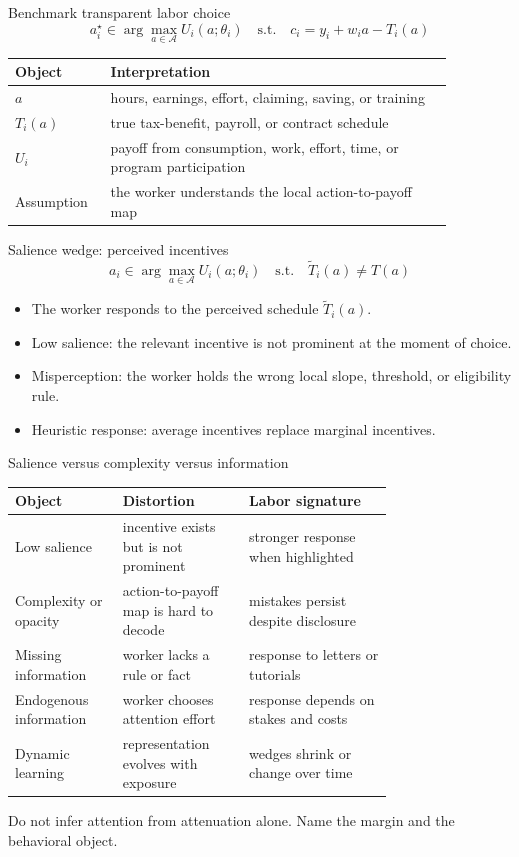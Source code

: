 \documentclass[aspectratio=169,11pt]{beamer}
\begin{document}
\begin{frame}{Benchmark transparent labor choice}
\[
a_i^\star \in \arg\max_{a \in \mathcal{A}} U_i(a;\theta_i)
\quad \text{s.t.} \quad c_i = y_i + w_i a - T_i(a)
\]

\small
\begin{tabular}{p{0.17\linewidth} p{0.70\linewidth}}
\toprule
Object & Interpretation \\
\midrule
$a$ & hours, earnings, effort, claiming, saving, or training \\
$T_i(a)$ & true tax-benefit, payroll, or contract schedule \\
$U_i$ & payoff from consumption, work, effort, time, or program participation \\
Assumption & the worker understands the local action-to-payoff map \\
\bottomrule
\end{tabular}
\end{frame}

\begin{frame}{Salience wedge: perceived incentives}
\[
a_i \in \arg\max_{a \in \mathcal{A}} U_i(a;\theta_i)
\quad \text{s.t.} \quad \tilde{T}_i(a) \neq T(a)
\]

\begin{itemize}
    \item The worker responds to the perceived schedule $\tilde{T}_i(a)$.
    \item Low salience: the relevant incentive is not prominent at the moment of choice.
    \item Misperception: the worker holds the wrong local slope, threshold, or eligibility rule.
    \item Heuristic response: average incentives replace marginal incentives.
\end{itemize}
\end{frame}

\begin{frame}{Salience versus complexity versus information}
\scriptsize
\begin{tabular}{p{0.20\linewidth} p{0.25\linewidth} p{0.30\linewidth}}
\toprule
Object & Distortion & Labor signature \\
\midrule
Low salience & incentive exists but is not prominent & stronger response when highlighted \\
Complexity or opacity & action-to-payoff map is hard to decode & mistakes persist despite disclosure \\
Missing information & worker lacks a rule or fact & response to letters or tutorials \\
Endogenous information & worker chooses attention effort & response depends on stakes and costs \\
Dynamic learning & representation evolves with exposure & wedges shrink or change over time \\
\bottomrule
\end{tabular}

\vspace{0.6em}
Do not infer attention from attenuation alone. Name the margin and the behavioral object.
\end{frame}
\end{document}
